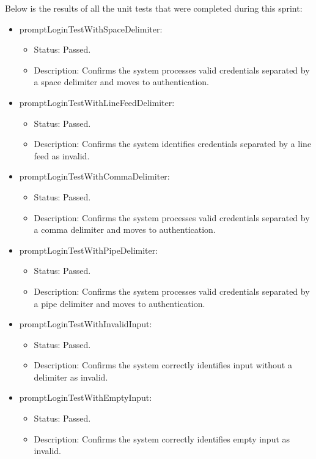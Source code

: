 \documentclass{scrreprt}
\begin{document}
Below is the results of all the unit tests that were completed during this sprint:

\begin{itemize}
    \item promptLoginTestWithSpaceDelimiter:
    \begin{itemize}
        \item Status: Passed.
        \item Description: Confirms the system processes valid credentials separated by a space delimiter and moves to authentication.
    \end{itemize}
    \item promptLoginTestWithLineFeedDelimiter:
    \begin{itemize}
        \item Status: Passed.
        \item Description: Confirms the system identifies credentials separated by a line feed as invalid.
    \end{itemize}
    \item promptLoginTestWithCommaDelimiter:
    \begin{itemize}
        \item Status: Passed.
        \item Description: Confirms the system processes valid credentials separated by a comma delimiter and moves to authentication.
    \end{itemize}
    \item promptLoginTestWithPipeDelimiter:
    \begin{itemize}
        \item Status: Passed.
        \item Description: Confirms the system processes valid credentials separated by a pipe delimiter and moves to authentication.
    \end{itemize}
    \item promptLoginTestWithInvalidInput:
    \begin{itemize}
        \item Status: Passed.
        \item Description: Confirms the system correctly identifies input without a delimiter as invalid.
    \end{itemize}
    \item promptLoginTestWithEmptyInput:
    \begin{itemize}
        \item Status: Passed.
        \item Description: Confirms the system correctly identifies empty input as invalid.

\end{itemize}
\end{itemize}
\end{document}
